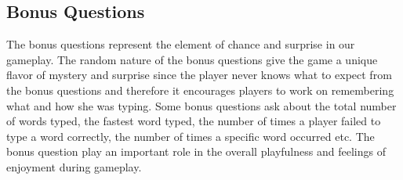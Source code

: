 \subsection{Bonus Questions} 
The bonus questions represent the element of chance and surprise in our gameplay. The random nature of the bonus questions give the game a unique flavor of mystery and surprise since the player never knows what to expect from the bonus questions and therefore it encourages players to work on remembering what and how she was typing. Some bonus questions ask about the total number of words typed, the fastest word typed, the number of times a player failed to type a word correctly, the number of times a specific word occurred etc. The bonus question play an important role in the overall playfulness and feelings of enjoyment during gameplay. 